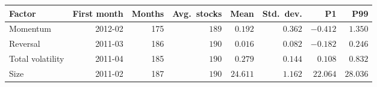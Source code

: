 \begin{tabular}{lrrrrrrr}
\toprule
Factor & First month & Months & Avg.\ stocks & Mean & Std.\ dev. & P1 & P99 \\
\midrule
Momentum & 2012-02 & 175 & $189$ & $0.192$ & $0.362$ & $-0.412$ & $1.350$ \\
Reversal & 2011-03 & 186 & $190$ & $0.016$ & $0.082$ & $-0.182$ & $0.246$ \\
Total volatility & 2011-04 & 185 & $190$ & $0.279$ & $0.144$ & $0.108$ & $0.832$ \\
Size & 2011-02 & 187 & $190$ & $24.611$ & $1.162$ & $22.064$ & $28.036$ \\
\bottomrule
\end{tabular}
